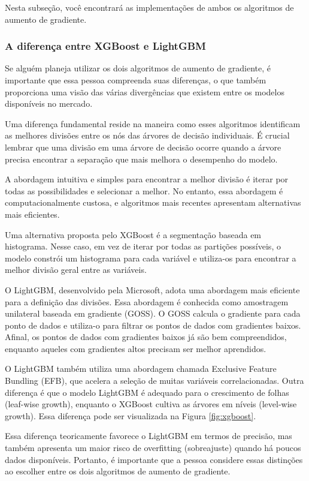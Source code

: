 Nesta subseção, você encontrará as implementações de ambos os algoritmos de aumento de gradiente.

\subsubsection{A diferen\c ca entre XGBoost e LightGBM}

Se alguém planeja utilizar os dois algoritmos de aumento de gradiente, é importante que essa pessoa compreenda suas diferenças, o que também proporciona uma visão das várias divergências que existem entre os modelos disponíveis no mercado.

Uma diferença fundamental reside na maneira como esses algoritmos identificam as melhores divisões entre os nós das árvores de decisão individuais. É crucial lembrar que uma divisão em uma árvore de decisão ocorre quando a árvore precisa encontrar a separação que mais melhora o desempenho do modelo.

A abordagem intuitiva e simples para encontrar a melhor divisão é iterar por todas as possibilidades e selecionar a melhor. No entanto, essa abordagem é computacionalmente custosa, e algoritmos mais recentes apresentam alternativas mais eficientes.

Uma alternativa proposta pelo XGBoost é a segmentação baseada em histograma. Nesse caso, em vez de iterar por todas as partições possíveis, o modelo constrói um histograma para cada variável e utiliza-os para encontrar a melhor divisão geral entre as variáveis.

O LightGBM, desenvolvido pela Microsoft, adota uma abordagem mais eficiente para a definição das divisões. Essa abordagem é conhecida como amostragem unilateral baseada em gradiente (GOSS). O GOSS calcula o gradiente para cada ponto de dados e utiliza-o para filtrar os pontos de dados com gradientes baixos. Afinal, os pontos de dados com gradientes baixos já são bem compreendidos, enquanto aqueles com gradientes altos precisam ser melhor aprendidos.

O LightGBM também utiliza uma abordagem chamada Exclusive Feature Bundling (EFB), que acelera a seleção de muitas variáveis correlacionadas. Outra diferença é que o modelo LightGBM é adequado para o crescimento de folhas (leaf-wise growth), enquanto o XGBoost cultiva as árvores em níveis (level-wise growth). Essa diferença pode ser visualizada na Figura \ref{fig:xgboost}.

Essa diferença teoricamente favorece o LightGBM em termos de precisão, mas também apresenta um maior risco de overfitting (sobreajuste) quando há poucos dados disponíveis. Portanto, é importante que a pessoa considere essas distinções ao escolher entre os dois algoritmos de aumento de gradiente.

